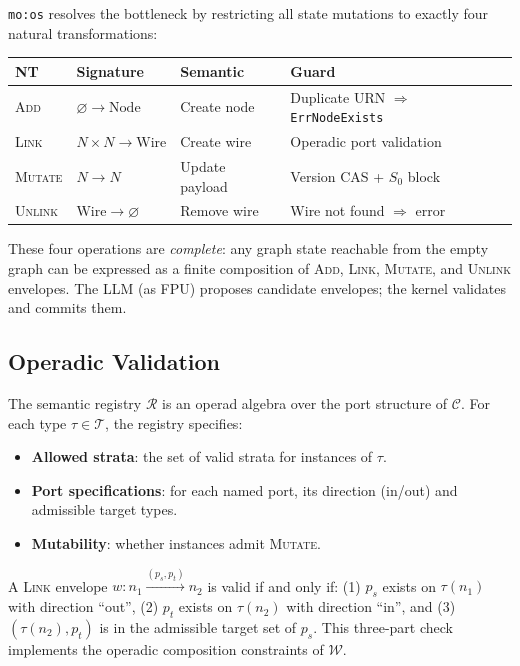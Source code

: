 \documentclass[submission,copyright,creativecommons]{eptcs}
\begin{document}
\texttt{mo:os} resolves the bottleneck by restricting all state mutations to
exactly four natural transformations:

\begin{center}
\begin{tabular}{@{}llll@{}}
\toprule
NT & Signature & Semantic & Guard \\
\midrule
\textsc{Add}    & $\varnothing \to \mathrm{Node}$ & Create node &
  Duplicate URN $\Rightarrow$ \texttt{ErrNodeExists} \\
\textsc{Link}   & $N \times N \to \mathrm{Wire}$ & Create wire &
  Operadic port validation \\
\textsc{Mutate} & $N \to N$ & Update payload &
  Version CAS + $S_0$ block \\
\textsc{Unlink} & $\mathrm{Wire} \to \varnothing$ & Remove wire &
  Wire not found $\Rightarrow$ error \\
\bottomrule
\end{tabular}
\end{center}

These four operations are \emph{complete}: any graph state reachable from the
empty graph can be expressed as a finite composition of \textsc{Add},
\textsc{Link}, \textsc{Mutate}, and \textsc{Unlink} envelopes. The LLM (as
FPU) proposes candidate envelopes; the kernel validates and commits them.

\subsection{Operadic Validation}

The semantic registry $\mathcal{R}$ is an operad algebra over the port
structure of $\mathcal{C}$. For each type $\tau \in \mathcal{T}$, the registry
specifies:
\begin{itemize}
  \item \textbf{Allowed strata}: the set of valid strata for instances of $\tau$.
  \item \textbf{Port specifications}: for each named port, its direction
        (in/out) and admissible target types.
  \item \textbf{Mutability}: whether instances admit \textsc{Mutate}.
\end{itemize}

A \textsc{Link} envelope $w\colon n_1 \xrightarrow{(p_s, p_t)} n_2$ is valid
if and only if: (1) $p_s$ exists on $\tau(n_1)$ with direction ``out'', (2)
$p_t$ exists on $\tau(n_2)$ with direction ``in'', and (3) $(\tau(n_2), p_t)$
is in the admissible target set of $p_s$. This three-part check implements the
operadic composition constraints of $\mathcal{W}$.
\end{document}

